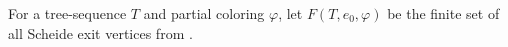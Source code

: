 \begin{definition}
For a tree-sequence $T$ and partial coloring $\varphi$, let
$F(T,e_0,\varphi)$ be the finite set of all Scheide exit vertices from
.
\end{definition}
